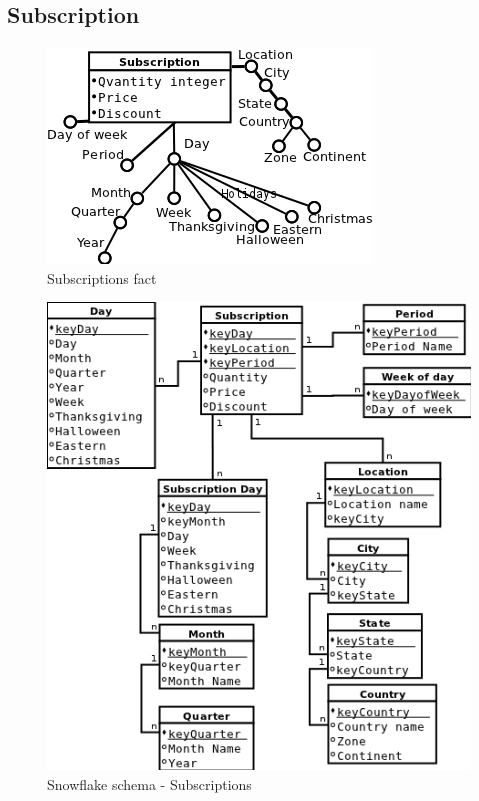 \subsection*{Subscription} 

\begin{figure}[!hbp]
    \includegraphics[scale=0.5]{fact_subscriptions}
\caption{\label{pic:f_sub}  Subscriptions fact}
\end{figure}

\begin{figure}[!hbp]
    \includegraphics[scale=0.5]{schema_snowflake_subscriptions}
\caption{\label{pic:sn_sub}  Snowflake schema - Subscriptions}
\end{figure}

